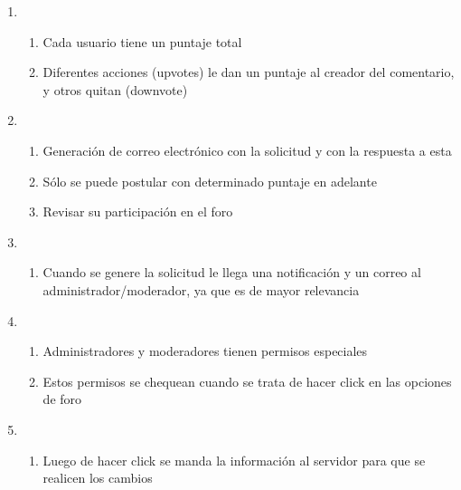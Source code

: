 \documentclass[12pt, letterpaper, notitlepage]{article}
\begin{document}
\begin{enumerate}
		\item {}
		\begin{enumerate}
			\item Cada usuario tiene un puntaje total
			\item Diferentes acciones (upvotes) le dan un puntaje al creador del comentario, y otros quitan (downvote)	
		\end{enumerate}
		
		\item {}
		\begin{enumerate}
			\item Generación de correo electrónico con la solicitud y con la respuesta a esta
			\item Sólo se puede postular con determinado puntaje en adelante
			\item Revisar su participación en el foro
		\end{enumerate}
		
		\item {}
		\begin{enumerate}
			\item Cuando se genere la solicitud le llega una notificación y un correo al administrador/moderador, ya que es de mayor relevancia
		\end{enumerate}
		
		\item {}
		\begin{enumerate}
			\item Administradores y moderadores tienen permisos especiales
			\item Estos permisos se chequean cuando se trata de hacer click en las opciones de foro
		\end{enumerate}
		
		\item {}
		\begin{enumerate}
			\item Luego de hacer click se manda la información al servidor para que se realicen los cambios
		\end{enumerate}
		

\end{enumerate}
\end{document}
